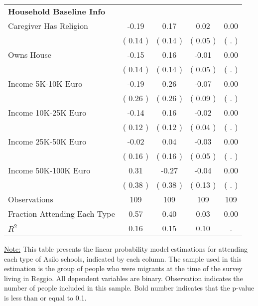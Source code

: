 \begin{table}[H]
{\begin{tabular}{lcccc}
\midrule
\textbf{Household Baseline Info} \\
\quad Caregiver Has Religion &     -0.19 &      0.17 &      0.02 &      0.00 \\
\quad  & (     0.14 ) & (     0.14 )  & (     0.05 )  & (        . )  \\
\quad Owns House &     -0.15 &      0.16 &     -0.01 &      0.00 \\
\quad  & (     0.14 ) & (     0.14 )  & (     0.05 )  & (        . )  \\
\quad Income 5K-10K Euro &     -0.19 &      0.26 &     -0.07 &      0.00 \\
\quad  & (     0.26 ) & (     0.26 )  & (     0.09 )  & (        . )  \\
\quad Income 10K-25K Euro &     -0.14 &      0.16 &     -0.02 &      0.00 \\
\quad  & (     0.12 ) & (     0.12 )  & (     0.04 )  & (        . )  \\
\quad Income 25K-50K Euro &     -0.02 &      0.04 &     -0.03 &      0.00 \\
\quad  & (     0.16 ) & (     0.16 )  & (     0.05 )  & (        . )  \\
\quad Income 50K-100K Euro &      0.31 &     -0.27 &     -0.04 &      0.00 \\
\quad  & (     0.38 ) & (     0.38 )  & (     0.13 )  & (        . )  \\
\midrule
Observations & 109 & 109 & 109 & 109 \\
Fraction Attending Each Type &      0.57 &      0.40 &      0.03 &      0.00 \\
\midrule
$ R^2$ &      0.16 &      0.15 &      0.10 &         . \\
\bottomrule
\end{tabular}}
\end{table}
\begin{footnotesize}
\noindent\underline{Note:} This table presents the linear probability model estimations for attending each type of Asilo schools, indicated by each column. The sample used in this estimation is the group of people who were migrants at the time of the survey living in Reggio. All dependent variables are binary. Observation indicates the number of people included in this sample. Bold number indicates that the p-value is less than or equal to 0.1.
\end{footnotesize}
